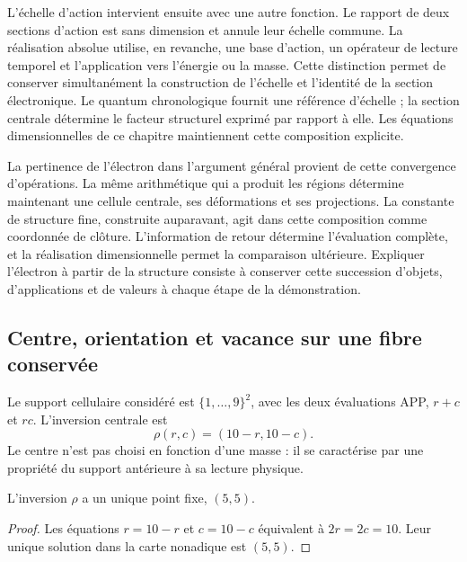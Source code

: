 L'échelle d'action intervient ensuite avec une autre fonction. Le rapport de
deux sections d'action est sans dimension et annule leur échelle commune.
La réalisation absolue utilise, en revanche, une base d'action, un
opérateur de lecture temporel et l'application vers l'énergie ou la masse. Cette distinction permet
de conserver simultanément la construction de l'échelle et l'identité
de la section électronique. Le quantum chronologique fournit une
référence d'échelle ; la section centrale détermine le facteur structurel
exprimé par rapport à elle. Les équations dimensionnelles de ce
chapitre maintiennent cette composition explicite.

La pertinence de l'électron dans l'argument général provient de cette
convergence d'opérations. La même arithmétique qui a produit les
régions détermine maintenant une cellule centrale, ses déformations et ses
projections. La constante de structure fine, construite auparavant, agit
dans cette composition comme coordonnée de clôture. L'information de
retour détermine l'évaluation complète, et la réalisation dimensionnelle
permet la comparaison ultérieure. Expliquer l'électron à partir de la structure
consiste à conserver cette succession d'objets, d'applications et de valeurs à chaque
étape de la démonstration.



\subsection{Centre, orientation et vacance sur une fibre conservée}

Le support cellulaire considéré est \(\{1,\ldots,9\}^2\), avec les deux
évaluations APP, \(r+c\) et \(rc\). L'inversion centrale est
\begin{equation}
 \rho(r,c)=(10-r,10-c).
 \label{x_reciprocidad:eq:el-inversion-central}
\end{equation}
Le centre n'est pas choisi en fonction d'une masse : il se caractérise par une propriété du
support antérieure à sa lecture physique.

\begin{proposition}
L'inversion \(\rho\) a un unique point fixe, \((5,5)\).
\end{proposition}
\begin{proof}
Les équations \(r=10-r\) et \(c=10-c\) équivalent à \(2r=2c=10\). Leur unique solution dans la carte nonadique est \((5,5)\).
\end{proof}

